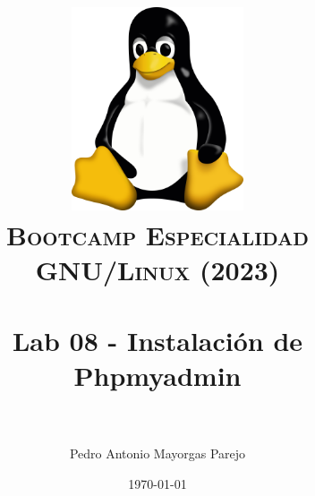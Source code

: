 

\graphicspath{ {img/} }

\title{
\normalfont \normalsize
\includegraphics[width=6cm,height=6cm]{logo}\\
\textsc{\textbf{Bootcamp Especialidad GNU/Linux (2023)}} \\ [25pt] %
\horrule{0.5pt} \\[0.4cm] %
\huge Lab 08 - Instalación de Phpmyadmin \\ %
\horrule{2pt} \\[0.5cm] %
}


\author{Pedro Antonio Mayorgas Parejo} %

\date{\normalsize\today} %




\maketitle %

\newpage %

\tableofcontents %

\newpage


